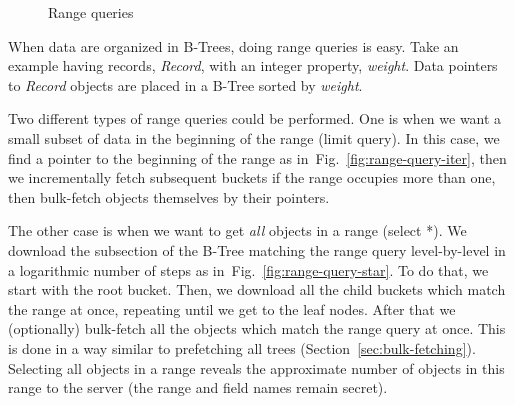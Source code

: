 \documentclass[notitlepage,longbibliography]{revtex4-1}
\newcommand{\figref}[1]{Fig.~\ref{#1}}
\begin{document}
\begin{figure}
	\begin{center}
        \qquad
	\end{center}
	\caption{Range queries}
	\label{fig:range-query}
\end{figure}

When data are organized in B-Trees, doing range queries is easy.
Take an example having records, \emph{Record}, with an integer property, \emph{weight}.
Data pointers to \emph{Record} objects are placed in a B-Tree sorted by \emph{weight}.

Two different types of range queries could be performed.
One is when we want a small subset of data in the beginning of the range (limit query).
In this case, we find a pointer to the beginning of the range as in~\figref{fig:range-query-iter}, then we incrementally fetch subsequent buckets if the range occupies more than one, then bulk-fetch objects themselves by their pointers.

The other case is when we want to get \emph{all} objects in a range (select *).
We download the subsection of the B-Tree matching the range query level-by-level in a logarithmic number of steps as in~\figref{fig:range-query-star}.
To do that, we start with the root bucket.
Then, we download all the child buckets which match the range at once, repeating until we get to the leaf nodes.
After that we (optionally) bulk-fetch all the objects which match the range query at once.
This is done in a way similar to prefetching all trees (Section~\ref{sec:bulk-fetching}).
Selecting all objects in a range reveals the approximate number of objects in this range to the server (the range and field names remain secret).
\end{document}

